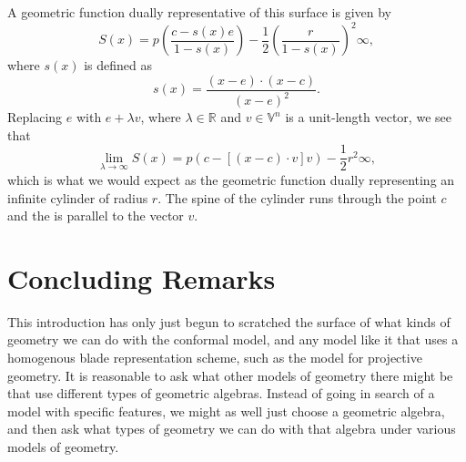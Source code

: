 \documentclass[12pt]{article}
\newcommand{\V}{\mathbb{V}}
\newcommand{\R}{\mathbb{R}}
\newcommand{\nvai}{\infty}
\begin{document}
A geometric function dually representative of this surface is given by
\begin{equation*}
S(x) = p\left(\frac{c-s(x)e}{1-s(x)}\right)-\frac{1}{2}\left(\frac{r}{1-s(x)}\right)^2\nvai,
\end{equation*}
where $s(x)$ is defined as
\begin{equation*}
s(x) = \frac{(x-e)\cdot(x-c)}{(x-e)^2}.
\end{equation*}
Replacing $e$ with $e+\lambda v$, where $\lambda\in\R$ and $v\in\V^n$ is a unit-length vector,
we see that
\begin{equation*}
\lim_{\lambda\to\infty} S(x) = p(c-[(x-c)\cdot v]v)-\frac{1}{2}r^2\nvai,
\end{equation*}
which is what we would expect as the geometric function dually representing an infinite cylinder
of radius $r$.  The spine of the cylinder runs through the point $c$ and the is parallel
to the vector $v$.



\section{Concluding Remarks}

This introduction has only just begun to scratched the surface of
what kinds of geometry we can do with the conformal model, and
any model like it that uses a homogenous blade representation scheme,
such as the model for projective geometry.  It is reasonable to ask
what other models of geometry there might be that use different
types of geometric algebras.  Instead of going in search of a model
with specific features, we might as well just choose a geometric algebra,
and then ask what types of geometry we can do with that algebra under
various models of geometry.



\end{document}

